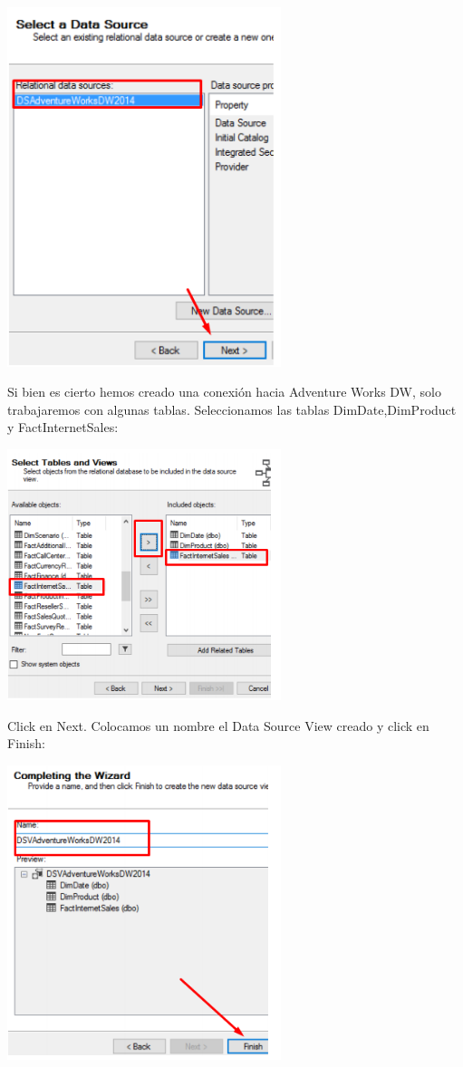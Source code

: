\begin{center}
	\includegraphics[width=8cm]{images/task2/img11}
\end{center}
Si bien es cierto hemos creado una conexión hacia Adventure Works DW, solo trabajaremos con algunas
tablas. Seleccionamos las tablas DimDate,DimProduct y FactInternetSales:
\begin{center}
	\includegraphics[width=8cm]{images/task2/img12}
\end{center}
Click en Next.
Colocamos un nombre el Data Source View creado y click en Finish:
\begin{center}
	\includegraphics[width=8cm]{images/task2/img13}
\end{center}
